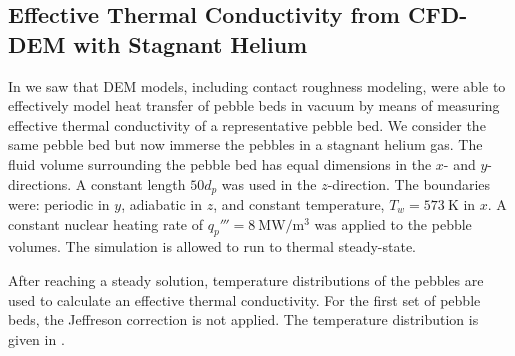 \FloatBarrier
\subsection{Effective Thermal Conductivity from CFD-DEM with Stagnant Helium}\label{sec:cfd-dem-effective-conductivity}
In  we saw that DEM models, including contact roughness modeling, were able to effectively model heat transfer of pebble beds in vacuum by means of measuring effective thermal conductivity of a representative pebble bed. We consider the same pebble bed but now immerse the pebbles in a stagnant helium gas. The fluid volume surrounding the pebble bed has equal dimensions in the $x$- and $y$-directions. A constant length $50d_p$ was used in the $z$-direction. The boundaries were: periodic in $y$, adiabatic in $z$, and constant temperature, $T_w = \SI{573}{\kelvin}$ in $x$. A constant nuclear heating rate of $q_p'''=\SI{8}{\mega\watt\per\cubic\meter}$ was applied to the pebble volumes. The simulation is allowed to run to thermal steady-state. 

After reaching a steady solution, temperature distributions of the pebbles are used to calculate an effective thermal conductivity. For the first set of pebble beds, the Jeffreson correction is not applied. The temperature distribution is given in . 

